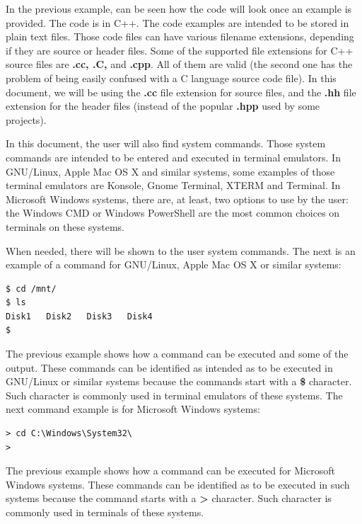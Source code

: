 \documentclass[11pt,twoside,openany,x11names,svgnames]{memoir}
\begin{document}
In the previous example, can be seen how the code will look once an example is provided. The code is in C++. The code examples are intended to be stored in plain text files. Those code files can have various filename extensions, depending if they are source or header files. Some of the supported file extensions for C++ source files are \textbf{.cc, .C,} and \textbf{.cpp}. All of them are valid (the second one has the problem of being easily confused with a C language source code file). In this document, we will be using the \textbf{.cc} file extension for source files, and the \textbf{.hh} file extension for the header files (instead of the popular \textbf{.hpp} used by some projects). 

In this document, the user will also find system commands. Those system commands are intended to be entered and executed in terminal emulators. In GNU/Linux, Apple Mac OS X and similar systems, some examples of those terminal emulators are Konsole, Gnome Terminal, XTERM and Terminal. In Microsoft Windows systems, there are, at least, two options to use by the user: the Windows CMD or Windows PowerShell are the most common choices on terminals on these systems.

When needed, there will be shown to the user system commands. The next is an example of a command for GNU/Linux, Apple Mac OS X or similar systems:

\begin{lstlisting}[frame=single,style=SystemCommandStyle]
$ cd /mnt/
$ ls
Disk1   Disk2   Disk3   Disk4
$
\end{lstlisting}

The previous example shows how a command can be executed and some of the output. These commands can be identified as intended as to be executed in GNU/Linux or similar systems because the commands start with a \textbf{\$} character. Such character is commonly used in terminal emulators of these systems. The next command example is for Microsoft Windows systems:

\begin{lstlisting}[frame=single,style=SystemCommandStyle]
> cd C:\Windows\System32\
> 
\end{lstlisting}

The previous example shows how a command can be executed for Microsoft Windows systems. These commands can be identified as to be executed in such systems because the command starts with a \textbf{\textgreater} character. Such character is commonly used in terminals of these systems.
\end{document}
